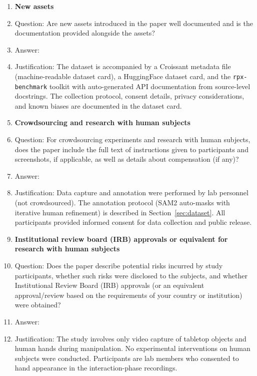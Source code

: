 \begin{enumerate}
\item {\bf New assets}
    \item[] Question: Are new assets introduced in the paper well documented and is the documentation provided alongside the assets?
    \item[] Answer: \answerYes{}
    \item[] Justification: The dataset is accompanied by a Croissant metadata file (machine-readable dataset card), a HuggingFace dataset card, and the \texttt{rpx-benchmark} toolkit with auto-generated API documentation from source-level docstrings. The collection protocol, consent details, privacy considerations, and known biases are documented in the dataset card.

\item {\bf Crowdsourcing and research with human subjects}
    \item[] Question: For crowdsourcing experiments and research with human subjects, does the paper include the full text of instructions given to participants and screenshots, if applicable, as well as details about compensation (if any)?
    \item[] Answer: \answerYes{}
    \item[] Justification: Data capture and annotation were performed by lab personnel (not crowdsourced). The annotation protocol (SAM2 auto-masks with iterative human refinement) is described in Section~\ref{sec:dataset}. All participants provided informed consent for data collection and public release.

\item {\bf Institutional review board (IRB) approvals or equivalent for research with human subjects}
    \item[] Question: Does the paper describe potential risks incurred by study participants, whether such risks were disclosed to the subjects, and whether Institutional Review Board (IRB) approvals (or an equivalent approval/review based on the requirements of your country or institution) were obtained?
    \item[] Answer: \answerNA{}
    \item[] Justification: The study involves only video capture of tabletop objects and human hands during manipulation. No experimental interventions on human subjects were conducted. Participants are lab members who consented to hand appearance in the interaction-phase recordings.


\end{enumerate}

